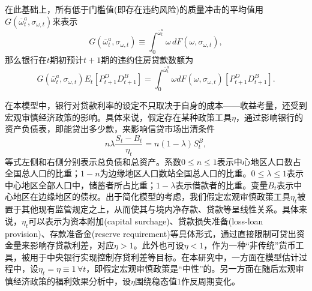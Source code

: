 在此基础上，所有低于门槛值(即存在违约风险)的质量冲击的平均值用$G \left( \overline{\omega}_{t}^{a}, \sigma_{\omega, t} \right)$来表示
\begin{equation}
  \label{eq:housing-G-function-CDF}
  G \left( \overline{\omega}_{t}^{a}, \sigma_{\omega, t} \right)
  \equiv \int_{0}^{\overline{\omega}_{t}^{a}}
  \omega \, d F \left(\omega, \sigma_{\omega, t} \right),
\end{equation}
那么银行在$t$期初预计$t+1$期的违约住房贷款数额为
\begin{equation}
  \label{eq:housing-expected-default-value}
  G \left( \overline{\omega}_{t}^{a}, \sigma_{\omega, t} \right)
  E_{t} \left[ P_{t+1}^{D} D_{t+1}^{B} \right]
  = \int_{0}^{\overline{\omega}_{t}^{a}}
  \omega d F \left(\omega, \sigma_{\omega, t} \right) \left[ P_{t+1}^{D} D_{t+1}^{B} \right].
\end{equation}

在本模型中，银行对贷款利率的设定不只取决于自身的成本——收益考量，还受到宏观审慎经济政策的影响。具体来说，假定存在某种政策工具$\eta$，通过影响银行的资产负债表，即能贷出多少款，来影响信贷市场出清条件
\begin{equation}
  \label{eq:housing-credit-mkt-clearing}
  n \lambda \frac{S_{t} - B_{t}}{\eta_{t}} =
  n \left( 1 - \lambda \right) S_{t}^{B},
\end{equation}
等式左侧和右侧分别表示总负债和总资产。系数$0 \le n  \le 1$表示中心地区人口数占全国总人口的比重；$1-n$为边缘地区人口数站全国总人口的比重。$0 \le \lambda  \le 1$表示中心地区全部人口中，储蓄者所占比重；$1-\lambda$表示借款者的比重。变量$B_t$表示中心地区在边缘地区的债权。出于简化模型的考虑，我们假定宏观审慎政策工具$\eta_{t}$被置于其他现有监管规定之上，从而使其与境内净存款、贷款等呈线性关系。具体来说，$\eta_{t}$可以表示为资本附加(capital surchage)、贷款损失准备(loss-loan provision)、存款准备金(reserve requirement)等具体形式，通过直接限制可贷出资金量来影响存贷款利差，对应$\eta > 1$。此外也可设$\eta <1$，作为一种``非传统''货币工具，被用于中央银行实现控制存贷利差等目标\citep{Gertler:2011fs}。在本研究中，一方面在模型估计过程中，设$\eta_{t} = \eta \equiv 1 \, \forall t$，即假定宏观审慎政策是``中性''的。另一方面在随后宏观审慎经济政策的福利效果分析中，设$\eta$围绕稳态值$1$作反周期变化。

